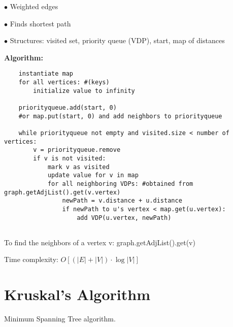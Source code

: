\documentclass{exam}
\begin{document}
    $\bullet$ Weighted edges
    
    $\bullet$ Finds shortest path
    
    $\bullet$ Structures: visited set, priority queue (VDP), start, map of distances
    
    \textbf{Algorithm:}
    
    \begin{lstlisting}
    instantiate map
    for all vertices: #(keys)
        initialize value to infinity
        
    priorityqueue.add(start, 0)
    #or map.put(start, 0) and add neighbors to priorityqueue
        
    while priorityqueue not empty and visited.size < number of vertices:
        v = priorityqueue.remove
        if v is not visited:
            mark v as visited
            update value for v in map
            for all neighboring VDPs: #obtained from graph.getAdjList().get(v.vertex)
                newPath = v.distance + u.distance
                if newPath to u's vertex < map.get(u.vertex):
                    add VDP(u.vertex, newPath)
                
    \end{lstlisting}
    
    To find the neighbors of a vertex v: graph.getAdjList().get(v)
    
    Time complexity: $O[(|E| + |V|)\cdot \log |V|]$
    
    \section{Kruskal's Algorithm}
    
    Minimum Spanning Tree algorithm.
    
    
    
\end{document}
